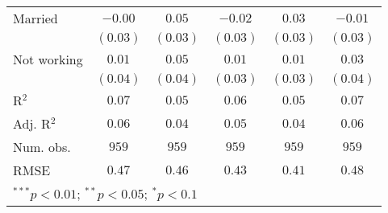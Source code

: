 \begin{table}
\begin{center}
\begin{tabular}{l c c c c c}
Married              & $-0.00$       & $0.05$        & $-0.02$       & $0.03$        & $-0.01$       \\
                     & $(0.03)$      & $(0.03)$      & $(0.03)$      & $(0.03)$      & $(0.03)$      \\
Not working          & $0.01$        & $0.05$        & $0.01$        & $0.01$        & $0.03$        \\
                     & $(0.04)$      & $(0.04)$      & $(0.03)$      & $(0.03)$      & $(0.04)$      \\
\midrule
R$^2$                & $0.07$        & $0.05$        & $0.06$        & $0.05$        & $0.07$        \\
Adj. R$^2$           & $0.06$        & $0.04$        & $0.05$        & $0.04$        & $0.06$        \\
Num. obs.            & $959$         & $959$         & $959$         & $959$         & $959$         \\
RMSE                 & $0.47$        & $0.46$        & $0.43$        & $0.41$        & $0.48$        \\
\bottomrule
\multicolumn{6}{l}{\scriptsize{$^{***}p<0.01$; $^{**}p<0.05$; $^{*}p<0.1$}}
\end{tabular}
\label{tab_emo}
\end{center}
\end{table}
